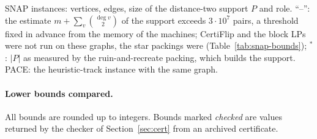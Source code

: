 \begin{table}[!tbp]
\centering
\caption{SNAP instances: vertices, edges, size of the distance-two support
$P$ and role.  ``--'': the estimate $m+\sum_v\binom{\deg v}2$ of the support
exceeds $3\cdot10^7$ pairs, a threshold fixed in advance from the memory of
the machines; CertiFlip and the block LPs were not run on these graphs, the
star packings were (Table~\ref{tab:snap-bounds}); $^\ast$: $|P|$ as measured
by the ruin-and-recreate packing, which builds the support.  PACE: the
heuristic-track instance with the same graph.}
\label{tab:instances}
\small
\begin{adjustbox}{max width=\textwidth}\end{adjustbox}
\end{table}

\paragraph{Lower bounds compared.}  All bounds are rounded up to integers.
Bounds marked \emph{checked} are values returned by the checker of
Section~\ref{sec:cert} from an archived certificate.
